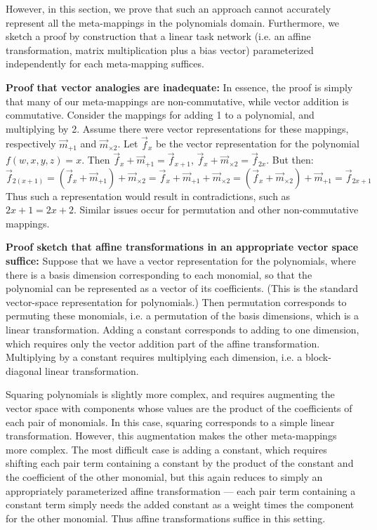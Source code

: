 However, in this section, we prove that such an approach cannot accurately represent all the meta-mappings in the polynomials domain. Furthermore, we sketch a proof by construction that a linear task network (i.e. an affine transformation, matrix multiplication plus a bias vector) parameterized independently for each meta-mapping suffices.

\textbf{Proof that vector analogies are inadequate:} In essence, the proof is simply that many of our meta-mappings are non-commutative, while vector addition is commutative. Consider the mappings for adding 1 to a polynomial, and multiplying by 2. Assume there were vector representations for these mappings, respectively \(\vec{m}_{+1}\) and \(\vec{m}_{\times 2}\). Let \(\vec{f}_{x}\) be the vector representation for the polynomial \(f(w,x,y,z) = x\). Then \(\vec{f}_{x} + \vec{m}_{+1} = \vec{f}_{x+1}\), \(\vec{f}_{x} + \vec{m}_{\times 2} = \vec{f}_{2x}\). But then:
\[ \vec{f}_{2(x + 1)} = \left(\vec{f}_{x} + \vec{m}_{+1}\right) + \vec{m}_{\times 2} = \vec{f}_{x} + \vec{m}_{+1} + \vec{m}_{\times 2} = \left(\vec{f}_{x} + \vec{m}_{\times 2}\right) + \vec{m}_{+1} = \vec{f}_{2x + 1}\]
Thus such a representation would result in contradictions, such as \(2x + 1 = 2x + 2\). Similar issues occur for permutation and other non-commutative mappings.

\textbf{Proof sketch that affine transformations in an appropriate vector space suffice:} Suppose that we have a vector representation for the polynomials, where there is a basis dimension corresponding to each monomial, so that the polynomial can be represented as a vector of its coefficients. (This is the standard vector-space representation for polynomials.) Then permutation corresponds to permuting these monomials, i.e. a permutation of the basis dimensions, which is a linear transformation. Adding a constant corresponds to adding to one dimension, which requires only the vector addition part of the affine transformation. Multiplying by a constant requires multiplying each dimension, i.e. a block-diagonal linear transformation.

Squaring polynomials is slightly more complex, and requires augmenting the vector space with components whose values are the product of the coefficients of each pair of monomials. In this case, squaring corresponds to a simple linear transformation. However, this augmentation makes the other meta-mappings more complex. The most difficult case is adding a constant, which requires shifting each pair term containing a constant by the product of the constant and the coefficient of the other monomial, but this again reduces to simply an appropriately parameterized affine transformation --- each pair term containing a constant term simply needs the added constant as a weight times the component for the other monomial. Thus affine transformations suffice in this setting.

